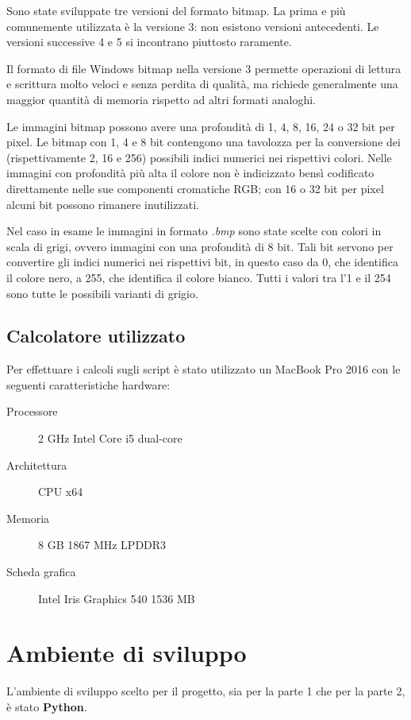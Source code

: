 \documentclass[preprint,12pt]{elsarticle}
\begin{document}
	Sono state sviluppate tre versioni del formato bitmap. La prima e più comunemente utilizzata è la versione 3: non esistono versioni antecedenti. Le versioni successive 4 e 5 si incontrano piuttosto raramente.
	
	Il formato di file Windows bitmap nella versione 3 permette operazioni di lettura e scrittura molto veloci e senza perdita di qualità, ma richiede generalmente una maggior quantità di memoria rispetto ad altri formati analoghi.
	
	Le immagini bitmap possono avere una profondità di 1, 4, 8, 16, 24 o 32 bit per pixel. Le bitmap con 1, 4 e 8 bit contengono una tavolozza per la conversione dei (rispettivamente 2, 16 e 256) possibili indici numerici nei rispettivi colori. Nelle immagini con profondità più alta il colore non è indicizzato bensì codificato direttamente nelle sue componenti cromatiche RGB; con 16 o 32 bit per pixel alcuni bit possono rimanere inutilizzati.
	
	Nel caso in esame le immagini in formato \textit{.bmp} sono state scelte con colori in scala di grigi, ovvero immagini con una profondità di 8 bit. Tali bit servono per convertire gli indici numerici nei rispettivi bit, in questo caso da 0, che identifica il colore nero, a 255, che identifica il colore bianco. Tutti i valori tra l'1 e il 254 sono tutte le possibili varianti di grigio.
	
	\subsection{Calcolatore utilizzato}
	Per effettuare i calcoli sugli script è stato utilizzato un MacBook Pro 2016 con le seguenti caratteristiche hardware:
	\begin{description}
		\item[Processore] 2 GHz Intel Core i5 dual-core
		\item[Architettura] CPU x64
		\item[Memoria] 8 GB 1867 MHz LPDDR3
		\item[Scheda grafica] Intel Iris Graphics 540 1536 MB
	\end{description}
	
	\newpage
	
	\section{Ambiente di sviluppo}
	
	L'ambiente di sviluppo scelto per il progetto, sia per la parte 1 che per la parte 2, è stato \textbf{Python}.
	
\end{document}
